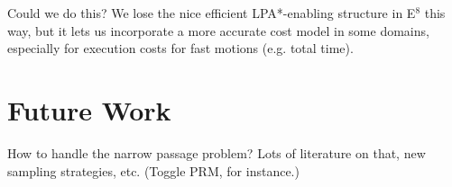 Could we do this?
We lose the nice efficient LPA*-enabling structure in
E$^8$ this way,
but it lets us incorporate a more accurate cost model in some domains,
especially for execution costs for fast motions (e.g. total time).

\section{Future Work}

How to handle the narrow passage problem?
Lots of literature on that, new sampling strategies, etc.
(Toggle PRM, for instance.)
